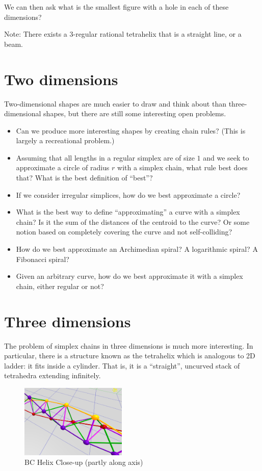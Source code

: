 \documentclass[11pt]{article}
\begin{document}
We can then ask what is the smallest figure with a hole in each of these dimensions?

Note: There exists a 3-regular rational tetrahelix that is a straight line, or a beam.


\section{Two dimensions}

Two-dimensional shapes are much easier to draw and think about than three-dimensional shapes, but there are still
some interesting open problems.

\begin{itemize}
\item Can we produce more interesting shapes by creating chain rules? (This is largely a recreational problem.)
\item Assuming that all lengths in a regular simplex are of size $1$ and we seek to approximate a circle of radius $r$ with a simplex chain,
  what rule best does that?  What is the best definition of ``best''?
\item If we consider irregular simplices, how do we best approximate a circle?
\item What is the best way to define ``approximating'' a curve with a simplex chain? Is it the sum of the distances of the centroid to the curve?
  Or some notion based on completely covering the curve and not self-colliding?
\item How do we best approximate an Archimedian spiral? A logarithmic spiral? A Fibonacci spiral?
  \item Given an arbitrary curve, how do we best approximate it with a simplex chain, either regular or not?
\end{itemize}

\section{Three dimensions}

The problem of simplex chains in three dimensions is much more interesting. In particular, there is a structure known as the
tetrahelix which is analogous to 2D ladder: it fits inside a cylinder. That is, it is a ``straight'', uncurved stack
of tetrahedra extending infinitely.



\begin{figure}
  \centering
     \includegraphics[width=0.45\textwidth]{figures/BCHelixCloseUp.png}
     \caption{BC Helix Close-up (partly along axis)}
  \label{fig:closeup}     
\end{figure}
\end{document}

